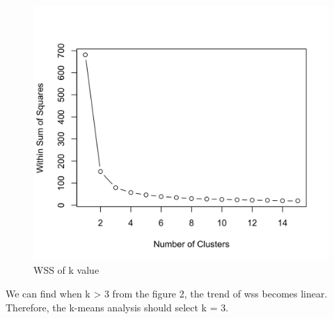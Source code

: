 \documentclass{article}
\begin{document}
\begin{figure}[H]
    \caption{WSS of k value}
    \includegraphics[width=1\textwidth]{Fig4}
\end{figure}

We can find when k > 3 from the figure 2, the trend of wss becomes linear.
Therefore, the k-means analysis should select k = 3.
\end{document}

